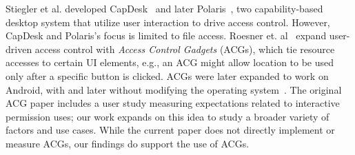Stiegler et al. developed CapDesk~\cite{capdesk} and later Polaris~\cite{Stiegler:2006}, 
two capability-based desktop system that utilize user interaction to drive access control.
However, CapDesk and Polaris's focus is limited to file access.
Roesner et. al~\cite{Roesner:2012} expand user-driven access control with \emph{Access Control
  Gadgets} (ACGs), which tie resource accesses to certain UI elements,
e.g., an ACG might allow location to be used only after a specific
button is clicked. ACGs were later expanded to work on Android, with 
and later without modifying the operating system~\cite{Roesner:2013,Ringer:2016}.
The original ACG paper includes a user study measuring 
expectations related to interactive permission uses; our work 
expands on this idea to study a broader variety of factors and 
use cases. 
While the current paper
does not directly implement or measure ACGs, our findings do support
the use of ACGs.
